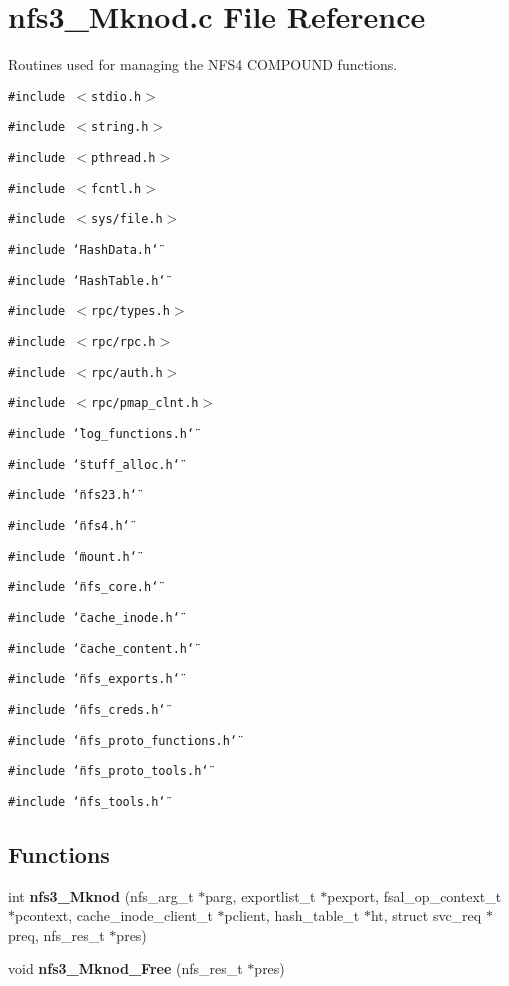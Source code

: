 \section{nfs3\_\-Mknod.c File Reference}
\label{nfs3__Mknod_8c}
Routines used for managing the NFS4 COMPOUND functions. 

{\tt \#include $<$stdio.h$>$}\par
{\tt \#include $<$string.h$>$}\par
{\tt \#include $<$pthread.h$>$}\par
{\tt \#include $<$fcntl.h$>$}\par
{\tt \#include $<$sys/file.h$>$}\par
{\tt \#include \char`\"{}Hash\-Data.h\char`\"{}}\par
{\tt \#include \char`\"{}Hash\-Table.h\char`\"{}}\par
{\tt \#include $<$rpc/types.h$>$}\par
{\tt \#include $<$rpc/rpc.h$>$}\par
{\tt \#include $<$rpc/auth.h$>$}\par
{\tt \#include $<$rpc/pmap\_\-clnt.h$>$}\par
{\tt \#include \char`\"{}log\_\-functions.h\char`\"{}}\par
{\tt \#include \char`\"{}stuff\_\-alloc.h\char`\"{}}\par
{\tt \#include \char`\"{}nfs23.h\char`\"{}}\par
{\tt \#include \char`\"{}nfs4.h\char`\"{}}\par
{\tt \#include \char`\"{}mount.h\char`\"{}}\par
{\tt \#include \char`\"{}nfs\_\-core.h\char`\"{}}\par
{\tt \#include \char`\"{}cache\_\-inode.h\char`\"{}}\par
{\tt \#include \char`\"{}cache\_\-content.h\char`\"{}}\par
{\tt \#include \char`\"{}nfs\_\-exports.h\char`\"{}}\par
{\tt \#include \char`\"{}nfs\_\-creds.h\char`\"{}}\par
{\tt \#include \char`\"{}nfs\_\-proto\_\-functions.h\char`\"{}}\par
{\tt \#include \char`\"{}nfs\_\-proto\_\-tools.h\char`\"{}}\par
{\tt \#include \char`\"{}nfs\_\-tools.h\char`\"{}}\par
\subsection*{Functions}
\begin{CompactItemize}
\item 
int {\bf nfs3\_\-Mknod} (nfs\_\-arg\_\-t $\ast$parg, exportlist\_\-t $\ast$pexport, fsal\_\-op\_\-context\_\-t $\ast$pcontext, cache\_\-inode\_\-client\_\-t $\ast$pclient, hash\_\-table\_\-t $\ast$ht, struct svc\_\-req $\ast$preq, nfs\_\-res\_\-t $\ast$pres)
\item 
void {\bf nfs3\_\-Mknod\_\-Free} (nfs\_\-res\_\-t $\ast$pres)
\end{CompactItemize}


